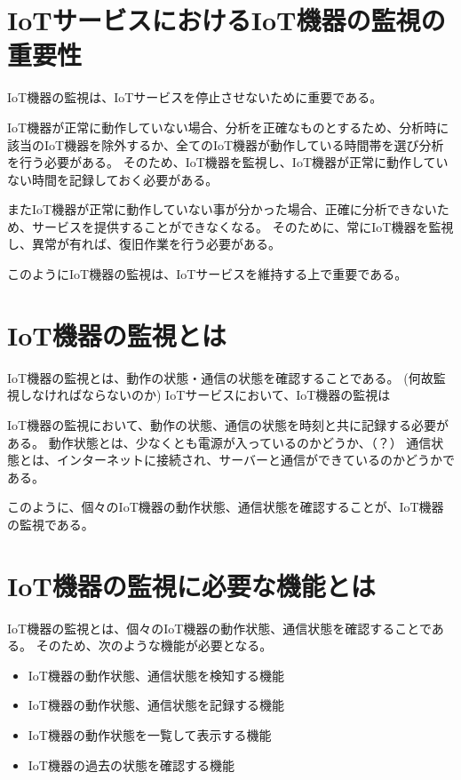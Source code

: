 \section{IoTサービスにおけるIoT機器の監視の重要性}
IoT機器の監視は、IoTサービスを停止させないために重要である。

IoT機器が正常に動作していない場合、分析を正確なものとするため、分析時に該当のIoT機器を除外するか、全てのIoT機器が動作している時間帯を選び分析を行う必要がある。
そのため、IoT機器を監視し、IoT機器が正常に動作していない時間を記録しておく必要がある。

またIoT機器が正常に動作していない事が分かった場合、正確に分析できないため、サービスを提供することができなくなる。
そのために、常にIoT機器を監視し、異常が有れば、復旧作業を行う必要がある。

このようにIoT機器の監視は、IoTサービスを維持する上で重要である。

\section{IoT機器の監視とは}%
IoT機器の監視とは、動作の状態・通信の状態を確認することである。
(何故監視しなければならないのか)
IoTサービスにおいて、IoT機器の監視は


IoT機器の監視において、動作の状態、通信の状態を時刻と共に記録する必要がある。
動作状態とは、少なくとも電源が入っているのかどうか、（？）
通信状態とは、インターネットに接続され、サーバーと通信ができているのかどうかである。
\medskip


このように、個々のIoT機器の動作状態、通信状態を確認することが、IoT機器の監視である。

\section{IoT機器の監視に必要な機能とは}%
IoT機器の監視とは、個々のIoT機器の動作状態、通信状態を確認することである。
そのため、次のような機能が必要となる。
\begin{itemize}
	\item IoT機器の動作状態、通信状態を検知する機能
	\item IoT機器の動作状態、通信状態を記録する機能
	\item IoT機器の動作状態を一覧して表示する機能
	\item IoT機器の過去の状態を確認する機能
\end{itemize}


